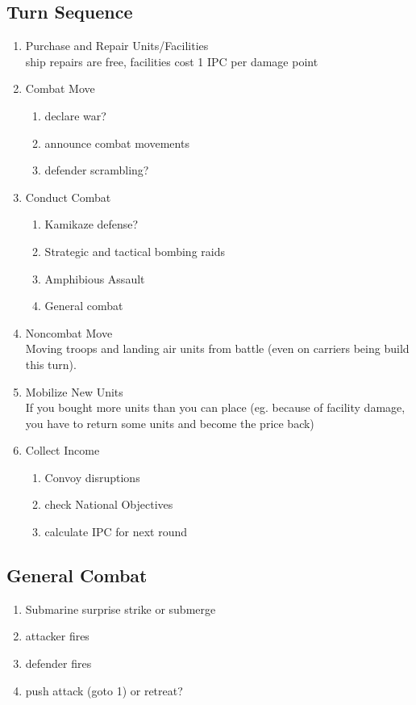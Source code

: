 \documentclass[10pt,a4paper,landscape]{article}
\begin{document}
\begin{multicols*}{3}
\section*{Turn Sequence}
\begin{enumerate}
\item Purchase and Repair Units/Facilities\\
ship repairs are free, facilities cost 1 IPC per damage point 
\item Combat Move
\begin{enumerate}
\item declare war?
\item announce combat movements
\item defender scrambling?
\end{enumerate}
\item Conduct Combat
\begin{enumerate}
\item Kamikaze defense?
\item Strategic and tactical bombing raids
\item Amphibious Assault
\item General combat
\end{enumerate}
\item Noncombat Move\\
Moving troops and landing air units from battle (even on carriers being build this turn).
\item Mobilize New Units\\
If you bought more units than you can place (eg. because of facility damage, you have to return some units and become the price back)
\item Collect Income
\begin{enumerate}
\item Convoy disruptions
\item check National Objectives
\item calculate IPC for next round
\end{enumerate}
\end{enumerate}

\subsection*{General Combat}
\begin{enumerate}
\item Submarine surprise strike or submerge
\item attacker fires
\item defender fires
\item push attack (goto 1) or retreat?
\end{enumerate}


\end{multicols*}
\end{document}
